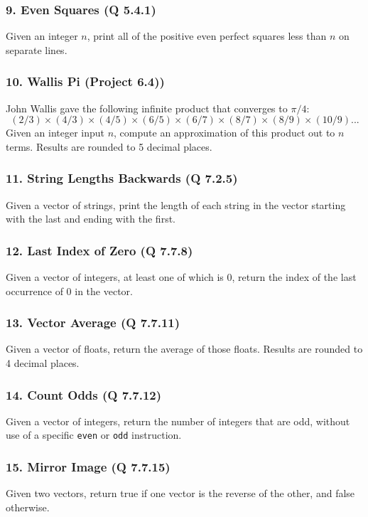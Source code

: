 \documentclass{sig-alternate}
\begin{document}
\subsubsection*{9. Even Squares (Q 5.4.1)}
Given an integer $n$, print all of the positive even perfect squares less than $n$ on separate lines.

\subsubsection*{10. Wallis Pi (Project 6.4))}
John Wallis gave the following infinite product that converges to $\pi/4$:
\[
(2/3)\times(4/3)\times(4/5)\times(6/5)\times(6/7)\times(8/7)\times(8/9)\times(10/9)...
\]
Given an integer input $n$, compute an approximation of this product out to $n$ terms. Results are rounded to 5 decimal places.

\subsubsection*{11. String Lengths Backwards (Q 7.2.5)}
Given a vector of strings, print the length of each string in the vector starting with the last and ending with the first.

\subsubsection*{12. Last Index of Zero (Q 7.7.8)}
Given a vector of integers, at least one of which is 0, return the index of the last occurrence of 0 in the vector.

\subsubsection*{13. Vector Average (Q 7.7.11)}
Given a vector of floats, return the average of those floats. Results are rounded to 4 decimal places.

\subsubsection*{14. Count Odds (Q 7.7.12)}
Given a vector of integers, return the number of integers that are odd, without use of a specific \texttt{even} or \texttt{odd} instruction.

\subsubsection*{15. Mirror Image (Q 7.7.15)}
Given two vectors, return true if one vector is the reverse of the other, and false otherwise.
\end{document}
